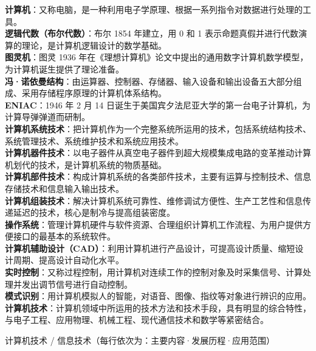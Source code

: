 \documentclass[a4paper,11pt]{article}
\begin{document}
\begin{keyterms}
\textbf{计算机}：又称电脑，是一种利用电子学原理、根据一系列指令对数据进行处理的工具。\\
\textbf{逻辑代数（布尔代数）}：布尔 1854 年建立，用 0 和 1 表示命题真假并进行代数演算的理论，是计算机逻辑设计的数学基础。\\
\textbf{图灵机}：图灵 1936 年在《理想计算机》论文中提出的通用数字计算机数学模型，为计算机诞生提供了理论准备。\\
\textbf{冯·诺依曼结构}：由运算器、控制器、存储器、输入设备和输出设备五大部分组成、采用存储程序原理的计算机体系结构。\\
\textbf{ENIAC}：1946 年 2 月 14 日诞生于美国宾夕法尼亚大学的第一台电子计算机，为计算导弹弹道而研制。\\
\textbf{计算机系统技术}：把计算机作为一个完整系统所运用的技术，包括系统结构技术、系统管理技术、系统维护技术和系统应用技术。\\
\textbf{计算机器件技术}：以电子器件从真空电子器件到超大规模集成电路的变革推动计算机划代的技术，是计算机系统的物质基础。\\
\textbf{计算机部件技术}：构成计算机系统的各类部件技术，主要有运算与控制技术、信息存储技术和信息输入输出技术。\\
\textbf{计算机组装技术}：解决计算机系统可靠性、维修调试方便性、生产工艺性和信息传递延迟的技术，核心是制冷与提高组装密度。\\
\textbf{操作系统}：管理计算机硬件与软件资源、合理组织计算机工作流程、为用户提供方便接口的最基本的系统软件。\\
\textbf{计算机辅助设计（CAD）}：利用计算机进行产品设计，可提高设计质量、缩短设计周期、提高设计自动化水平。\\
\textbf{实时控制}：又称过程控制，用计算机对连续工作的控制对象及时采集信号、计算处理并发出调节信号进行自动控制。\\
\textbf{模式识别}：用计算机模拟人的智能，对语音、图像、指纹等对象进行辨识的应用。\\
\textbf{计算机技术}：计算机领域中所运用的技术方法和技术手段，具有明显的综合特性，与电子工程、应用物理、机械工程、现代通信技术和数学等紧密结合。
\end{keyterms}

\begin{contrast}{计算机技术 / 信息技术（每行依次为：主要内容·发展历程·应用范围）}
\end{contrast}
\end{document}
